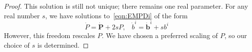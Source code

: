 \documentclass{article}
\begin{document}
\begin{lem}[Case (a)]
\begin{proof}
This solution is still not unique; there remains one real parameter. For any real number $s$, we have solutions to~\eqref{eqn:EMPDi} of the form
\[
\dot P = \mathbf{\dot{P}} + 2sP, \;\;\;
\dot b^i = \mathbf{\dot{b}}^i + sb^i
\]
However, this freedom rescales $P$. We have chosen a preferred scaling of $P$, so our choice of $s$ is determined.


\end{proof}
\end{lem}
\end{document}
